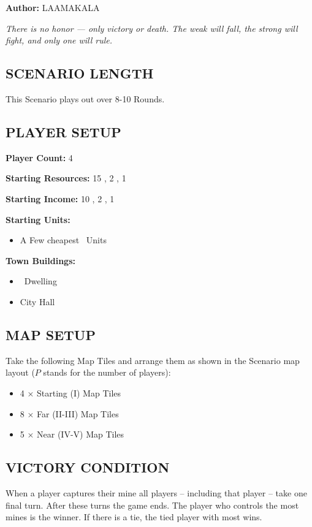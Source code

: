 
\begin{multicols*}{2}

\textbf{Author:} LAAMAKALA

\textit{There is no honor — only victory or death. The weak will fall, the strong will fight, and only one will rule.}

\subsection*{\MakeUppercase{Scenario Length}}
This Scenario plays out over 8-10 Rounds.

\subsection*{\MakeUppercase{Player Setup}}
\textbf{Player Count:} 4

\textbf{Starting Resources:} 15 , 2 , 1 

\textbf{Starting Income:} 10 , 2 , 1 

\textbf{Starting Units:}
\begin{itemize}
  \item A Few cheapest \silver\ Units
\end{itemize}

\textbf{Town Buildings:}
\begin{itemize}
  \item \bronze\ Dwelling
  \item City Hall
\end{itemize}

\subsection*{\MakeUppercase{Map Setup}}
Take the following Map Tiles and arrange them as shown in the Scenario map layout ($P$ stands for the number of players):

\begin{itemize}
  \item 4 × Starting (I) Map Tiles
  \item 8 × Far (II-III) Map Tiles
  \item 5 × Near (IV-V) Map Tiles
\end{itemize}

\subsection*{\MakeUppercase{Victory Condition}}
When a player captures their  mine all players -- including that player -- take one final turn. After these turns the game ends. The player who controls the most mines is the winner. If there is a tie, the tied player with most  wins.


\end{multicols*}
